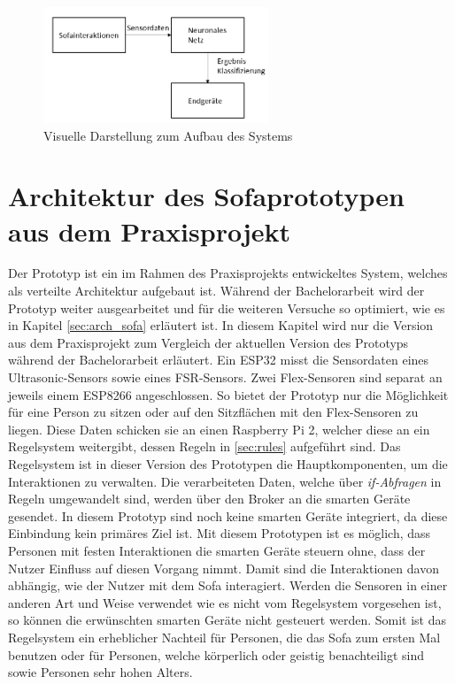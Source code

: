 \begin{figure}[H]
	\centering
		\includegraphics[width=0.6\textwidth]{images/arch_grob.png}
	\caption{Visuelle Darstellung zum Aufbau des Systems}
	\label{fig:arch_grob}
\end{figure}


\section{Architektur des Sofaprototypen aus dem Praxisprojekt}
\label{sec:arch_pp}
Der Prototyp ist ein im Rahmen des Praxisprojekts entwickeltes System, welches als verteilte Architektur aufgebaut ist. Während der Bachelorarbeit wird der Prototyp weiter ausgearbeitet und für die weiteren Versuche so optimiert, wie es in Kapitel \ref{sec:arch_sofa} erläutert ist. In diesem Kapitel wird nur die Version aus dem Praxisprojekt zum Vergleich der aktuellen Version des Prototyps während der Bachelorarbeit erläutert.
\newline
\newline
Ein ESP32 misst die Sensordaten eines Ultrasonic-Sensors sowie eines FSR-Sensors. Zwei Flex-Sensoren sind separat an jeweils einem ESP8266 angeschlossen. So bietet der Prototyp nur die Möglichkeit für eine Person zu sitzen oder auf den Sitzflächen mit den Flex-Sensoren zu liegen. Diese Daten schicken sie an einen Raspberry Pi 2, welcher diese an ein Regelsystem weitergibt, dessen Regeln in \ref{sec:rules} aufgeführt sind. Das Regelsystem ist in dieser Version des Prototypen die Hauptkomponenten, um die Interaktionen zu verwalten. Die verarbeiteten Daten, welche über \emph{if-Abfragen} in Regeln umgewandelt sind, werden über den Broker an die smarten Geräte gesendet. In diesem Prototyp sind noch keine smarten Geräte integriert, da diese Einbindung kein primäres Ziel ist. Mit diesem Prototypen ist es möglich, dass Personen mit festen Interaktionen die smarten Geräte steuern ohne, dass der Nutzer Einfluss auf diesen Vorgang nimmt. Damit sind die Interaktionen davon abhängig, wie der Nutzer mit dem Sofa interagiert. Werden die Sensoren in einer anderen Art und Weise verwendet wie es nicht vom Regelsystem vorgesehen ist, so können die erwünschten smarten Geräte nicht gesteuert werden. Somit ist das Regelsystem ein erheblicher Nachteil für Personen, die das Sofa zum ersten Mal benutzen oder für Personen, welche körperlich oder geistig benachteiligt sind sowie Personen sehr hohen Alters.
